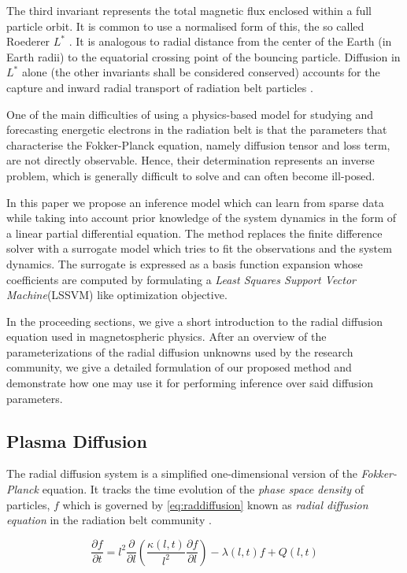 The third invariant represents the total magnetic flux enclosed within 
a full particle orbit. It is common to use a normalised form of this, the 
so called Roederer $L^{*}$ \citep{Roederer1970}. It is analogous to radial 
distance from the center of the Earth (in Earth radii) to the equatorial 
crossing point of the bouncing particle. Diffusion in $L^{*}$ alone 
(the other invariants shall be considered conserved) accounts for the
capture and inward radial transport of radiation belt particles 
\citep{Roederer1970,JGR:JGR4463}.

One of the main difficulties of using a physics-based model for studying and 
forecasting energetic electrons in the radiation belt is that the parameters 
that characterise the Fokker-Planck equation, namely diffusion tensor and loss term,
are not directly observable. Hence, their determination represents an inverse problem,
which is generally difficult to solve and can often become ill-posed.

In this paper we propose an inference model which can learn from sparse
data while taking into account prior knowledge of the system dynamics
in the form of a linear partial differential equation. The method replaces
the finite difference solver with a surrogate model which tries to fit
the observations and the system dynamics. The surrogate is expressed as
a basis function expansion whose coefficients are computed by formulating
a \emph{Least Squares Support Vector Machine}(LSSVM) like optimization
objective.

In the proceeding sections, we give a short introduction to the radial 
diffusion equation used in magnetospheric physics. After an overview of 
the parameterizations of the radial diffusion unknowns used by the research community, 
we give a detailed formulation of our proposed method and demonstrate 
how one may use it for performing inference over said diffusion parameters.

\subsection{Plasma Diffusion}

The radial diffusion system is a simplified one-dimensional version of
the \emph{Fokker-Planck} equation. It tracks the time evolution of the
\emph{phase space density} of particles, $f$ which is governed by 
\cref{eq:raddiffusion} known as \emph{radial diffusion equation} in the 
radiation belt community \citep{JGRA:JGRA9345}.

\begin{equation}\label{eq:raddiffusion}
  \frac{\partial{f}}{\partial{t}} = l^2 \frac{\partial}{\partial{l}}\left( \frac{\kappa(l,
      t)}{l^{2}} \frac{\partial{f}}{\partial{l}} \right) - \lambda(l,
  t) f +  Q(l, t)
\end{equation}

